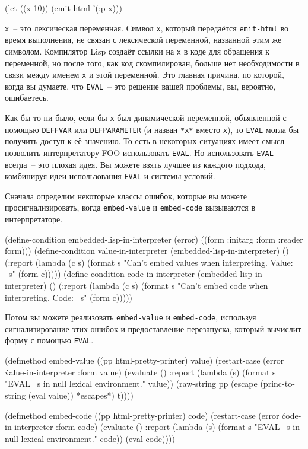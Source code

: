 \begin{myverb}
(let ((x 10)) (emit-html '(:p x)))
\end{myverb}

\noindent{}\lstinline!х!~-- это лексическая переменная. Символ \lstinline!х!, который передаётся
\lstinline!emit-html! во время выполнения, не связан с лексической переменной, названной
этим же символом.  Компилятор Lisp создаёт ссылки на \lstinline!х! в коде для обращения к
переменной, но после того, как код скомпилирован, больше нет необходимости в связи между
именем \lstinline!х! и этой переменной. Это главная причина, по которой, когда вы думаете,
что \lstinline!EVAL!~-- это решение вашей проблемы, вы, вероятно, ошибаетесь.

Как бы то ни было, если бы \lstinline{х} был динамической переменной, объявленной с по\-мощью
\lstinline{DEFFVAR} или \lstinline{DEFPARAMETER} (и назван \lstinline{*х*} вместо \lstinline{х}), то
\lstinline{EVAL} могла бы получить доступ к её значению.  То есть в некоторых ситуациях имеет
смысл позволить интерпретатору FOO использовать \lstinline{EVAL}. Но использовать \lstinline{EVAL}
всегда~-- это плохая идея. Вы можете взять лучшее из каждого подхода, комбинируя идеи
использования \lstinline{EVAL} и системы условий.

Сначала определим некоторые классы ошибок, которые вы можете просигнализировать,
когда \lstinline{embed-value} и \lstinline{embed-code} вызываются в интерпретаторе.

\begin{myverb}
(define-condition embedded-lisp-in-interpreter (error)
  ((form :initarg :form :reader form)))
(define-condition value-in-interpreter (embedded-lisp-in-interpreter) ()
  (:report
   (lambda (c s) 
     (format s "Can't embed values when interpreting. Value: ~s" (form c)))))
(define-condition code-in-interpreter (embedded-lisp-in-interpreter) ()
  (:report
   (lambda (c s) 
     (format s "Can't embed code when interpreting. Code: ~s" (form c)))))
\end{myverb}

Потом вы можете реализовать \lstinline{embed-value} и \lstinline{embed-code}, используя
сигнализирование этих ошибок и предоставление перезапуска, который вычислит форму с
помощью \lstinline{EVAL}.

\begin{myverb}
(defmethod embed-value ((pp html-pretty-printer) value)
  (restart-case (error \'value-in-interpreter :form value)
    (evaluate ()
      :report (lambda (s) (format s "EVAL ~s in null lexical environment." value))
      (raw-string pp (escape (princ-to-string (eval value)) *escapes*) t))))

(defmethod embed-code ((pp html-pretty-printer) code)
  (restart-case (error \'code-in-interpreter :form code)
    (evaluate ()
      :report (lambda (s) (format s "EVAL ~s in null lexical environment." code))
      (eval code))))
\end{myverb}

